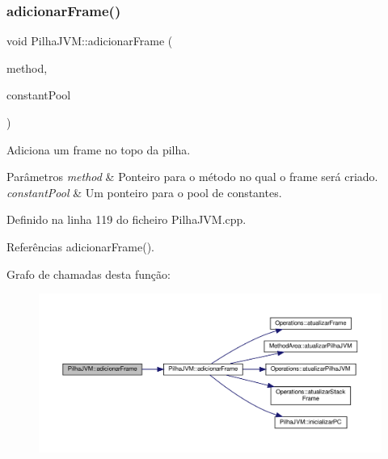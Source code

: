 \subsubsection{\texorpdfstring{adicionar\+Frame()}{adicionarFrame()}\hspace{0.1cm}{\footnotesize\ttfamily [2/2]}}
{\footnotesize\ttfamily void Pilha\+J\+V\+M\+::adicionar\+Frame (\begin{DoxyParamCaption}\item[{\hyperlink{structMethod__info}{Method\+\_\+info} $\ast$}]{method,  }\item[{\hyperlink{structCp__info}{Cp\+\_\+info} $\ast$}]{constant\+Pool }\end{DoxyParamCaption})}



Adiciona um frame no topo da pilha. 


\begin{DoxyParams}{Parâmetros}
{\em method} & Ponteiro para o método no qual o frame será criado. \\
\hline
{\em constant\+Pool} & Um ponteiro para o pool de constantes. \\
\hline
\end{DoxyParams}


Definido na linha 119 do ficheiro Pilha\+J\+V\+M.\+cpp.



Referências adicionar\+Frame().

Grafo de chamadas desta função\+:\nopagebreak
\begin{figure}[H]
\begin{center}
\leavevmode
\includegraphics[width=350pt]{classPilhaJVM_a6a47624a1e9923e59258454e6e6d1271_cgraph}
\end{center}
\end{figure}
\mbox{\label{classPilhaJVM_a43252c128cf31ac202373d6b66868a77}} 
